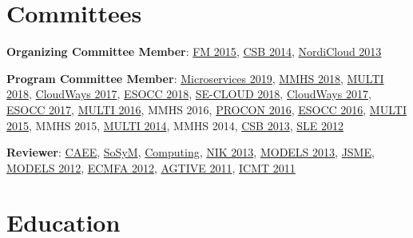 \documentclass[a4paper,online]{adcv}
\begin{document}
\ifextended
  \section{Committees}\label{sec:committees}

  \textbf{Organizing Committee Member}: \href{https://doi.org/10.1007/978-3-319-19249-9}{FM 2015}, \href{https://doi.org/10.1007/978-3-319-14886-1}{CSB 2014}, \href{https://doi.org/10.1145/2513534.2513535}{NordiCloud 2013}

  \textbf{Program Committee Member}: \href{https://www.conf-micro.services/2019/}{Microservices 2019}, \href{http://ceur-ws.org/Vol-2336/}{MMHS 2018}, \href{https://www.wi-inf.uni-duisburg-essen.de/MULTI2018/}{MULTI 2018}, \href{https://sites.google.com/site/cloudwaysws18/}{CloudWays 2017}, \href{https://doi.org/10.1007/978-3-319-99819-0}{ESOCC 2018}, \href{http://www.se-cloud.scitevents.org/}{SE-CLOUD 2018}, \href{https://sites.google.com/site/cloudways17/}{CloudWays 2017}, \href{https://doi.org/10.1007/978-3-319-67262-5}{ESOCC 2017}, \href{https://swt4.informatik.uni-mannheim.de/multi-2016/}{MULTI 2016}, MMHS 2016, \href{http://procon-workshop.com/}{PROCON 2016}, \href{https://doi.org/10.1007/978-3-319-44482-6}{ESOCC 2016}, \href{https://miso.es/multi/2015/}{MULTI 2015}, MMHS 2015, \href{https://miso.es/multi/2014/}{MULTI 2014}, MMHS 2014, \href{https://sites.google.com/site/cloudbrokerworkshop/}{CSB 2013}, \href{https://doi.org/10.1007/978-3-642-36089-3}{SLE 2012}

  \textbf{Reviewer}: \href{https://ees.elsevier.com/compeleceng/}{CAEE}, \href{https://www.springer.com/journal/10270}{SoSyM}, \href{https://www.springer.com/computer/journal/607}{Computing}, \href{https://nik.no/nik-2013/}{NIK 2013}, \href{https://doi.org/10.1007/978-3-642-41533-3}{MODELS 2013}, \href{https://onlinelibrary.wiley.com/journal/20477481}{JSME}, \href{https://doi.org/10.1007/978-3-642-33666-9}{MODELS 2012}, \href{https://doi.org/10.1007/978-3-642-31491-9}{ECMFA 2012}, \href{https://doi.org/10.1007/978-3-642-34176-2}{AGTIVE 2011}, \href{https://doi.org/10.1007/978-3-642-21732-6}{ICMT 2011}
\fi

\section{Education}
\end{document}
